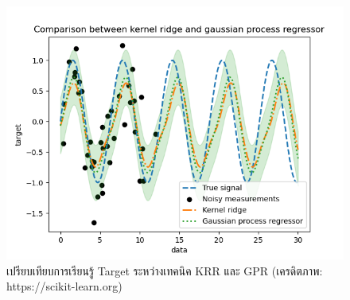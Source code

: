 \begin{figure}[H]
    \centering
    \includegraphics[width=0.8\linewidth]{fig/plot_gpr_kernel.png}
    \caption{เปรียบเทียบการเรียนรู้ Target ระหว่างเทคนิค KRR และ GPR (เครดิตภาพ: https://scikit-learn.org)}
    \label{fig:krr_gpr}
\end{figure}
